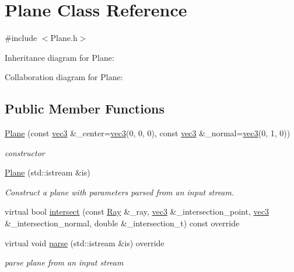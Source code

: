 \hypertarget{classPlane}{}\section{Plane Class Reference}
\label{classPlane}


{\ttfamily \#include $<$Plane.\+h$>$}



Inheritance diagram for Plane\+:


Collaboration diagram for Plane\+:
\subsection*{Public Member Functions}
\begin{DoxyCompactItemize}
\item 
\hyperlink{classPlane_a6ce42dd3bf06b497256454534f582a80}{Plane} (const \hyperlink{classvec3}{vec3} \&\+\_\+center=\hyperlink{classvec3}{vec3}(0, 0, 0), const \hyperlink{classvec3}{vec3} \&\+\_\+normal=\hyperlink{classvec3}{vec3}(0, 1, 0))
\begin{DoxyCompactList}\small\item\em constructor \end{DoxyCompactList}\item 
\hyperlink{classPlane_a5236597c4a6324126e8746ecb4af1535}{Plane} (std\+::istream \&is)
\begin{DoxyCompactList}\small\item\em Construct a plane with parameters parsed from an input stream. \end{DoxyCompactList}\item 
virtual bool \hyperlink{classPlane_ab146bb10ad52e8535dad25d531c43b86}{intersect} (const \hyperlink{classRay}{Ray} \&\+\_\+ray, \hyperlink{classvec3}{vec3} \&\+\_\+intersection\+\_\+point, \hyperlink{classvec3}{vec3} \&\+\_\+intersection\+\_\+normal, double \&\+\_\+intersection\+\_\+t) const override
\item 
virtual void \hyperlink{classPlane_af5361222d1aa404fc720d7b4b68a634c}{parse} (std\+::istream \&is) override
\begin{DoxyCompactList}\small\item\em parse plane from an input stream \end{DoxyCompactList}\end{DoxyCompactItemize}
